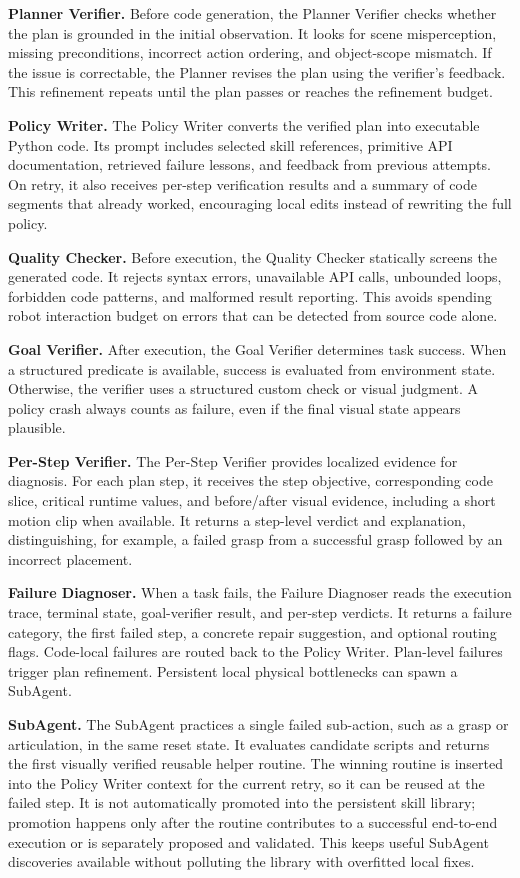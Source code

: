 \textbf{Planner Verifier.}
Before code generation, the Planner Verifier checks whether the plan is grounded
in the initial observation. It looks for scene misperception, missing
preconditions, incorrect action ordering, and object-scope mismatch. If the
issue is correctable, the Planner revises the plan using the verifier's
feedback. This refinement repeats until the plan passes or reaches the
refinement budget.

\textbf{Policy Writer.}
The Policy Writer converts the verified plan into executable Python code. Its
prompt includes selected skill references, primitive API documentation,
retrieved failure lessons, and feedback from previous attempts. On retry, it
also receives per-step verification results and a summary of code segments that
already worked, encouraging local edits instead of rewriting the full policy.

\textbf{Quality Checker.}
Before execution, the Quality Checker statically screens the generated code. It
rejects syntax errors, unavailable API calls, unbounded loops, forbidden code
patterns, and malformed result reporting. This avoids spending robot
interaction budget on errors that can be detected from source code alone.

\textbf{Goal Verifier.}
After execution, the Goal Verifier determines task success. When a structured
predicate is available, success is evaluated from environment state. Otherwise,
the verifier uses a structured custom check or visual judgment. A policy crash
always counts as failure, even if the final visual state appears plausible.

\textbf{Per-Step Verifier.}
The Per-Step Verifier provides localized evidence for diagnosis. For each plan
step, it receives the step objective, corresponding code slice, critical runtime
values, and before/after visual evidence, including a short motion clip when
available. It returns a step-level verdict and explanation, distinguishing, for
example, a failed grasp from a successful grasp followed by an incorrect
placement.

\textbf{Failure Diagnoser.}
When a task fails, the Failure Diagnoser reads the execution trace, terminal
state, goal-verifier result, and per-step verdicts. It returns a failure
category, the first failed step, a concrete repair suggestion, and optional
routing flags. Code-local failures are routed back to the Policy Writer.
Plan-level failures trigger plan refinement. Persistent local physical
bottlenecks can spawn a SubAgent.

\textbf{SubAgent.}
The SubAgent practices a single failed sub-action, such as a grasp or
articulation, in the same reset state. It evaluates candidate scripts and
returns the first visually verified reusable helper routine. The winning
routine is inserted into the Policy Writer context for the current retry, so it
can be reused at the failed step. It is not automatically promoted into the
persistent skill library; promotion happens only after the routine contributes
to a successful end-to-end execution or is separately proposed and validated.
This keeps useful SubAgent discoveries available without polluting the library
with overfitted local fixes.

